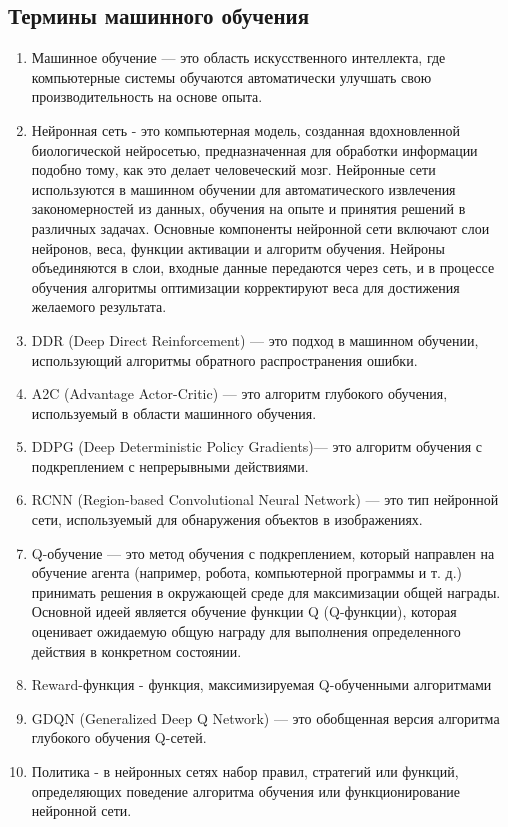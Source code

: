 \documentclass[a4paper,14pt]{extarticle}
\begin{document}
\subsection{Термины машинного обучения}
\begin{enumerate}

\item Машинное обучение — это область искусственного интеллекта, где компьютерные системы обучаются автоматически улучшать свою производительность на основе опыта.
\item Нейронная сеть - это компьютерная модель, созданная вдохновленной биологической нейросетью, предназначенная для обработки информации подобно тому, как это делает человеческий мозг. Нейронные сети используются в машинном обучении для автоматического извлечения закономерностей из данных, обучения на опыте и принятия решений в различных задачах.
Основные компоненты нейронной сети включают слои нейронов, веса, функции активации и алгоритм обучения. Нейроны объединяются в слои, входные данные передаются через сеть, и в процессе обучения алгоритмы оптимизации корректируют веса для достижения желаемого результата.
\item DDR (Deep Direct Reinforcement) — это подход в машинном обучении, использующий алгоритмы обратного распространения ошибки.
\item A2C (Advantage Actor-Critic) — это алгоритм глубокого обучения, используемый в области машинного обучения.
\item DDPG (Deep Deterministic Policy Gradients)— это алгоритм обучения с подкреплением с непрерывными действиями.
\item RCNN (Region-based Convolutional Neural Network) — это тип нейронной сети, используемый для обнаружения объектов в изображениях.
\item Q-обучение — это метод обучения с подкреплением, который направлен на обучение агента (например, робота, компьютерной программы и т. д.) принимать решения в окружающей среде для максимизации общей награды. Основной идеей является обучение функции Q (Q-функции), которая оценивает ожидаемую общую награду для выполнения определенного действия в конкретном состоянии.
\item Reward-функция - функция, максимизируемая Q-обученными алгоритмами
\item GDQN (Generalized Deep Q Network) — это обобщенная версия алгоритма глубокого обучения Q-сетей.
\item Политика - в нейронных сетях набор правил, стратегий или функций, определяющих поведение алгоритма обучения или функционирование нейронной сети.

\end{enumerate}
\end{document}
